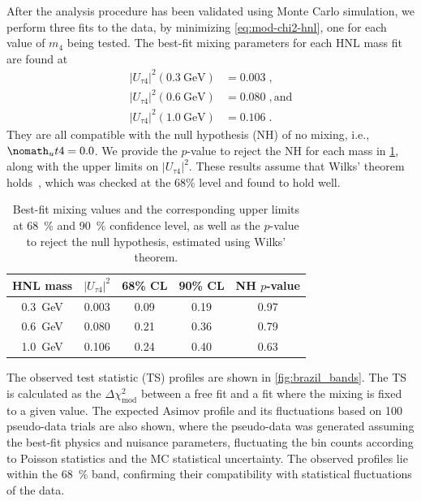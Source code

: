 \documentclass[
    aps,
    prd,
    reprint,
    amsmath,
    amssymb,
    nofootinbib,
    linenumbers,
    superscriptaddress,
    floatfix
]{revtex4-2}
\newcommand{\gev}{\giga\electronvolt}
\def\ut4{$|U_{\tau4}|^2$}
\def\nomathut4{|U_{\tau4}|^2} %
\renewcommand{\rm}{\mathrm}
\newcommand{\rm}{\mathrm}
\providecommand{\DIFaddtex}[1]{{\protect\color{blue}\uwave{#1}}} %
\providecommand{\DIFdeltex}[1]{{\protect\color{red}\sout{#1}}}                      %
\providecommand{\DIFaddbegin}{} %
\providecommand{\DIFaddend}{} %
\providecommand{\DIFdelbegin}{} %
\providecommand{\DIFdelend}{} %
\providecommand{\DIFadd}[1]{\texorpdfstring{\DIFaddtex{#1}}{#1}} %
\providecommand{\DIFdel}[1]{\texorpdfstring{\DIFdeltex{#1}}{}} %
\newcommand{\DIFscaledelfig}{0.5}
\newlength{\DIFdelgraphicswidth} %
\newlength{\DIFdelgraphicsheight} %
\newcommand{\DIFaddincludegraphics}[2][]{{\color{blue}\fbox{\DIFOincludegraphics[#1]{#2}}}} %
\newcommand{\DIFdelincludegraphics}[2][]{%
\sbox{\DIFdelgraphicsbox}{\DIFOincludegraphics[#1]{#2}}%
\settoboxwidth{\DIFdelgraphicswidth}{\DIFdelgraphicsbox} %
\settoboxtotalheight{\DIFdelgraphicsheight}{\DIFdelgraphicsbox} %
\scalebox{\DIFscaledelfig}{%
\parbox[b]{\DIFdelgraphicswidth}{\usebox{\DIFdelgraphicsbox}\\[-\baselineskip] \rule{\DIFdelgraphicswidth}{0em}}\llap{\resizebox{\DIFdelgraphicswidth}{\DIFdelgraphicsheight}{%
\setlength{\unitlength}{\DIFdelgraphicswidth}%
\begin{picture}(1,1)%
\thicklines\linethickness{2pt} %
{\color[rgb]{1,0,0}\put(0,0){\framebox(1,1){}}}%
{\color[rgb]{1,0,0}\put(0,0){\line( 1,1){1}}}%
{\color[rgb]{1,0,0}\put(0,1){\line(1,-1){1}}}%
\end{picture}%
}\hspace*{3pt}}} %
} %
\DeclareRobustCommand{\DIFaddbegin}{\DIFOaddbegin \let\includegraphics\DIFaddincludegraphics} %
\DeclareRobustCommand{\DIFaddend}{\DIFOaddend \let\includegraphics\DIFOincludegraphics} %
\DeclareRobustCommand{\DIFdelbegin}{\DIFOdelbegin \let\includegraphics\DIFdelincludegraphics} %
\DeclareRobustCommand{\DIFdelend}{\DIFOaddend \let\includegraphics\DIFOincludegraphics} %
\begin{document}
After the analysis procedure has been validated using Monte Carlo simulation, we perform three fits to the data, by minimizing \cref{eq:mod-chi2-hnl}, one for each value of $m_{4}$ being tested.
The best-fit mixing parameters for each HNL mass fit are found at
\begin{align*}
    |U_{\tau4}|^2(\SI{0.3}{\gev}) &= 0.003 \;, \\
    |U_{\tau4}|^2(\SI{0.6}{\gev}) &= 0.080 \;, \rm{and} \\
    |U_{\tau4}|^2(\SI{1.0}{\gev}) &= 0.106 \;.
\end{align*}
They are all compatible with the null hypothesis (NH) of no mixing, i.e., \DIFdelbegin \DIFdel{$\nomath_ut4=0.0$}\DIFdelend \DIFaddbegin \DIFadd{$\nomathut4=0.0$}\DIFaddend .
We provide the $p$-value to reject the NH for each mass in \cref{tab:best_fit_parameters_and_confidence_levels}, along with the upper limits on \ut4. 
These results assume that Wilks' theorem holds~\cite{wilks_theorem}, which was checked at the 68\% level and found to hold well.
\begin{table}[h]
    \begin{tabular}{ ccccc }
        \hline\hline
        \textbf{HNL mass} & \textbf{\ut4} & \textbf{68\% CL} & \textbf{90\% CL} & \textbf{NH $p$-value} \\    
        \hline\hline
        \SI{0.3}{\gev} & 0.003 & 0.09 & 0.19 & \SI{0.97}{} \\
        \SI{0.6}{\gev} & 0.080 & 0.21 & 0.36 & \SI{0.79}{} \\
        \SI{1.0}{\gev} & 0.106 & 0.24 & 0.40 & \SI{0.63}{} \\
        \hline
    \end{tabular}
    \internallinenumbers
    \caption{Best-fit mixing values and the corresponding upper limits at \SI{68}{\percent} and \SI{90}{\percent} confidence level, as well as the $p$-value to reject the null hypothesis, estimated using Wilks' theorem.}
    \label{tab:best_fit_parameters_and_confidence_levels}
\end{table}
The observed test statistic (TS) profiles are shown in \cref{fig:brazil_bands}. The TS is calculated as the $\Delta\chi^2_{\mathrm{mod}}$ between a free fit and a fit where the mixing is fixed to a given value.
The expected Asimov profile and its fluctuations based on 100 pseudo-data trials are also shown, where the pseudo-data was generated assuming the best-fit physics and nuisance parameters, fluctuating the bin counts according to Poisson statistics and the MC statistical uncertainty.
The observed profiles lie within the \SI{68}{\percent} band, confirming their compatibility with statistical fluctuations of the data.
\end{document}
